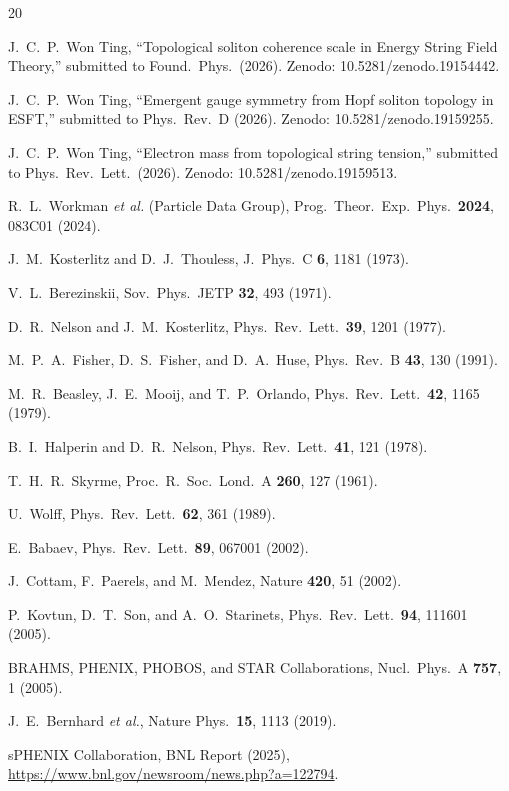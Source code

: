 ﻿\documentclass[twocolumn,showpacs,preprintnumbers,amsmath,amssymb,prd]{revtex4-2}
\begin{document}
\begin{thebibliography}{20}

 J.~C.~P.~Won Ting, ``Topological soliton coherence scale in Energy String Field Theory,'' submitted to Found.\ Phys.\ (2026). Zenodo: 10.5281/zenodo.19154442.

 J.~C.~P.~Won Ting, ``Emergent gauge symmetry from Hopf soliton topology in ESFT,'' submitted to Phys.\ Rev.\ D (2026). Zenodo: 10.5281/zenodo.19159255.

 J.~C.~P.~Won Ting, ``Electron mass from topological string tension,'' submitted to Phys.\ Rev.\ Lett.\ (2026). Zenodo: 10.5281/zenodo.19159513.

 R.~L.~Workman \textit{et al.} (Particle Data Group), Prog.\ Theor.\ Exp.\ Phys.\ \textbf{2024}, 083C01 (2024).

 J.~M.~Kosterlitz and D.~J.~Thouless, J.\ Phys.\ C \textbf{6}, 1181 (1973).

 V.~L.~Berezinskii, Sov.\ Phys.\ JETP \textbf{32}, 493 (1971).

 D.~R.~Nelson and J.~M.~Kosterlitz, Phys.\ Rev.\ Lett.\ \textbf{39}, 1201 (1977).

 M.~P.~A.~Fisher, D.~S.~Fisher, and D.~A.~Huse, Phys.\ Rev.\ B \textbf{43}, 130 (1991).

 M.~R.~Beasley, J.~E.~Mooij, and T.~P.~Orlando, Phys.\ Rev.\ Lett.\ \textbf{42}, 1165 (1979).

 B.~I.~Halperin and D.~R.~Nelson, Phys.\ Rev.\ Lett.\ \textbf{41}, 121 (1978).

 T.~H.~R.~Skyrme, Proc.\ R.\ Soc.\ Lond.\ A \textbf{260}, 127 (1961).

 U.~Wolff, Phys.\ Rev.\ Lett.\ \textbf{62}, 361 (1989).

 E.~Babaev, Phys.\ Rev.\ Lett.\ \textbf{89}, 067001 (2002).

 J.~Cottam, F.~Paerels, and M.~Mendez, Nature \textbf{420}, 51 (2002).

 P.~Kovtun, D.~T.~Son, and A.~O.~Starinets, Phys.\ Rev.\ Lett.\ \textbf{94}, 111601 (2005).

 BRAHMS, PHENIX, PHOBOS, and STAR Collaborations, Nucl.\ Phys.\ A \textbf{757}, 1 (2005).

 J.~E.~Bernhard \textit{et al.}, Nature Phys.\ \textbf{15}, 1113 (2019).

 sPHENIX Collaboration, BNL Report (2025), \url{https://www.bnl.gov/newsroom/news.php?a=122794}.

\end{thebibliography}
\end{document}
